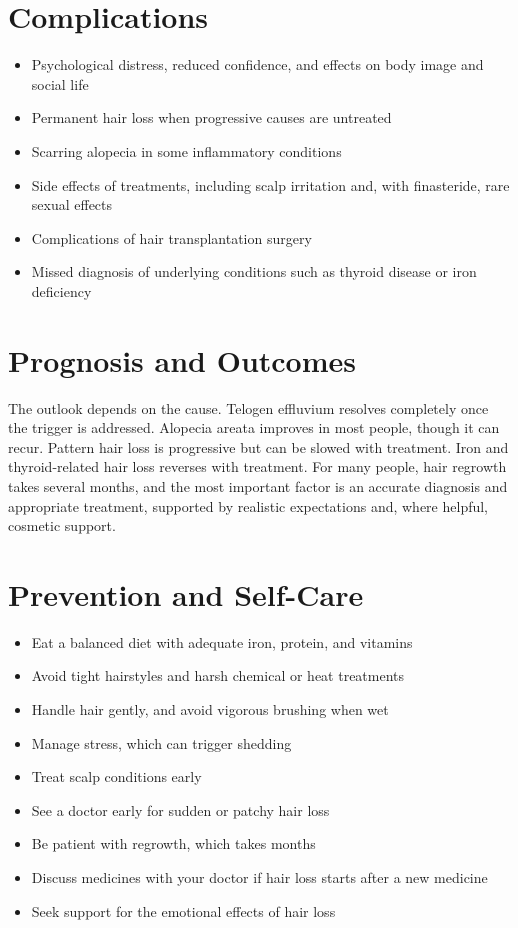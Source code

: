 \section*{Complications}
\begin{itemize}
    \item Psychological distress, reduced confidence, and effects on body image and social life
    \item Permanent hair loss when progressive causes are untreated
    \item Scarring alopecia in some inflammatory conditions
    \item Side effects of treatments, including scalp irritation and, with finasteride, rare sexual effects
    \item Complications of hair transplantation surgery
    \item Missed diagnosis of underlying conditions such as thyroid disease or iron deficiency
\end{itemize}

\section*{Prognosis and Outcomes}
The outlook depends on the cause. Telogen effluvium resolves completely once the trigger is addressed. Alopecia areata improves in most people, though it can recur. Pattern hair loss is progressive but can be slowed with treatment. Iron and thyroid-related hair loss reverses with treatment. For many people, hair regrowth takes several months, and the most important factor is an accurate diagnosis and appropriate treatment, supported by realistic expectations and, where helpful, cosmetic support.

\section*{Prevention and Self-Care}
\begin{itemize}
    \item Eat a balanced diet with adequate iron, protein, and vitamins
    \item Avoid tight hairstyles and harsh chemical or heat treatments
    \item Handle hair gently, and avoid vigorous brushing when wet
    \item Manage stress, which can trigger shedding
    \item Treat scalp conditions early
    \item See a doctor early for sudden or patchy hair loss
    \item Be patient with regrowth, which takes months
    \item Discuss medicines with your doctor if hair loss starts after a new medicine
    \item Seek support for the emotional effects of hair loss
\end{itemize}

